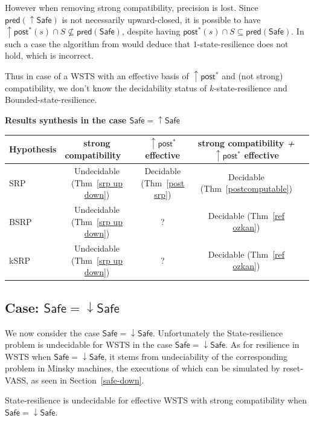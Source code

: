 \documentclass[runningheads]{llncs}
\newcommand{\pred}{\textsf{pred}}
\newcommand{\post}{\textsf{post}}
\newcommand{\Bad}{\textsf{Bad}}
\newcommand{\Safe}{\textsf{Safe}}
\begin{document}
However when removing strong compatibility, precision is lost.
Since $\pred(\uparrow \Safe)$ is not necessarily upward-closed, it is possible to have 
 $\uparrow \post^* (s) \cap S \not\subseteq \pred(\Safe)$,
despite having 
$\post^* (s) \cap S \subseteq \pred( \Safe)$.
In such a case the algorithm from
\cite{DBLP:conf/gg/Ozkan22} would deduce that {\sc $1$-state-resilience} does not hold,
which is incorrect.

Thus in case of a WSTS with an effective basis of $\uparrow \post^*$ and (not strong) compatibility, we don't know the decidability status of {\sc $k$-state-resilience} and 
{\sc Bounded-state-resilience}. 


{\bf Results synthesis in the case $\Safe = \uparrow \Safe$}
\begin{center}
\begin{tabular}{ | l | c | c | c | c |}
\hline  Hypothesis & strong %
			compatibility ~ & $\uparrow \post^*$ effective 
			& strong %
					compatibility \textit{+} $\uparrow \post^*$ effective \\ \hline
   SRP & Undecidable (Thm~\ref{srp up down}) & Decidable (Thm~\ref{post srp})  & Decidable (Thm~\ref{postcomputable})\\ \hline
   BSRP & Undecidable (Thm~\ref{srp up down}) &  ?  & Decidable (Thm~\ref{ref ozkan}) \\ \hline
      kSRP & Undecidable (Thm~\ref{srp up down}) & ? & Decidable (Thm~\ref{ref ozkan}) \\ \hline
 \end{tabular}
\end{center}


\subsection{Case: $\Safe = \downarrow \Safe$%
}


We now consider the case $\Safe = \downarrow \Safe$.
%
Unfortunately the {\sc State-resilience} problem is undecidable for WSTS in the case $\Safe = \downarrow \Safe$. As for resilience in WSTS when $\Safe = \downarrow \Safe$, it stems from undeciability of the corresponding problem in Minsky machines, the executions of which can be simulated by reset-VASS, as seen in 
Section~\ref{safe-down}.

\begin{theorem}\label{srp down up}
{\sc State-resilience} is undecidable for effective WSTS with  strong  compatibility 
when
$\Safe=\downarrow \Safe$.
\end{theorem}
\end{document}
